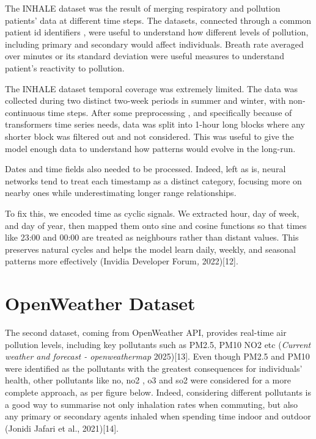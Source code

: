 \documentclass[12pt,a4paper]{report}
\begin{document}
The INHALE dataset was the result of merging respiratory and pollution
patients' data at different time steps. The datasets, connected through
a common patient id identifiers , were useful to understand how
different levels of pollution, including primary and secondary would
affect individuals. Breath rate averaged over minutes or its standard
deviation were useful measures to understand patient's reactivity to
pollution.

The INHALE dataset temporal coverage was extremely limited. The data was
collected during two distinct two-week periods in summer and winter,
with non-continuous time steps. After some preprocessing , and
specifically because of transformers time series needs, data was split
into 1-hour long blocks where any shorter block was filtered out and not
considered. This was useful to give the model enough data to understand
how patterns would evolve in the long-run.

Dates and time fields also needed to be processed. Indeed, left as is,
neural networks tend to treat each timestamp as a distinct category,
focusing more on nearby ones while underestimating longer range
relationships.

To fix this, we encoded time as cyclic signals. We extracted hour, day
of week, and day of year, then mapped them onto sine and cosine
functions so that times like 23:00 and 00:00 are treated as neighbours
rather than distant values. This preserves natural cycles and helps the
model learn daily, weekly, and seasonal patterns more effectively
(Invidia Developer Forum\emph{,} 2022){[}12{]}.

\section{OpenWeather Dataset}
The second dataset, coming from OpenWeather API, provides real-time air
pollution levels, including key pollutants such as PM2.5, PM10 NO2 etc
(\emph{Current weather and forecast - openweathermap} 2025){[}13{]}.
Even though PM2.5 and PM10 were identified as the pollutants with the
greatest consequences for individuals' health, other pollutants like no,
no2 , o3 and so2 were considered for a more complete approach, as per figure below. Indeed, considering different pollutants is a good way to
summarise not only inhalation rates when commuting, but also any primary
or secondary agents inhaled when spending time indoor and outdoor
(Jonidi Jafari et al., 2021){[}14{]}.

\usepackage{caption}   %
\end{document}

